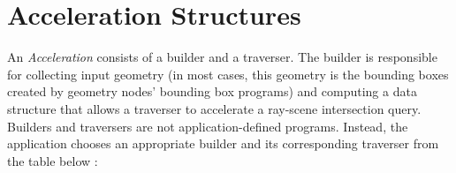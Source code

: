 
\chapter{Acceleration Structures} %

\label{AppendixB} %

An \textit{Acceleration} consists of a builder and a traverser. The builder is responsible for collecting input geometry (in most cases, this geometry is the bounding boxes created by geometry nodes' bounding box programs) and computing a data structure that allows a traverser to accelerate a ray-scene intersection query. Builders and traversers are not application-defined programs. Instead, the application chooses an appropriate builder and its corresponding traverser from the table below \citep{Reference6}:\\

